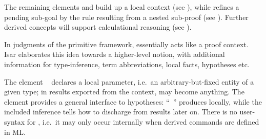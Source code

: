 \begin{isabellebody}
\begin{isamarkuptext}
  The remaining elements \hyperlink{command.fix}{\mbox{}} and \hyperlink{command.assume}{\mbox{}} build up
  a local context (see ), while
  \hyperlink{command.show}{\mbox{}} refines a pending sub-goal by the rule resulting
  from a nested sub-proof (see ).
  Further derived concepts will support calculational reasoning (see
  ).%
\end{isamarkuptext}%
\isamarkuptrue%
%
\isamarkuptrue%
%
\begin{isamarkuptext}%
In judgments  of the primitive framework, 
  essentially acts like a proof context.  Isar elaborates this idea
  towards a higher-level notion, with additional information for
  type-inference, term abbreviations, local facts, hypotheses etc.

  The element \hyperlink{command.fix}{\mbox{}}~ declares a local
  parameter, i.e.\ an arbitrary-but-fixed entity of a given type; in
  results exported from the context,  may become anything.
  The \hyperlink{command.assume}{\mbox{}}~ element provides a
  general interface to hypotheses: ``\hyperlink{command.assume}{\mbox{}}~'' produces  locally, while the
  included inference tells how to discharge  from results
   later on.  There is no user-syntax for , i.e.\ it may only occur internally when derived
  commands are defined in ML.


\end{isamarkuptext}
\end{isabellebody}
